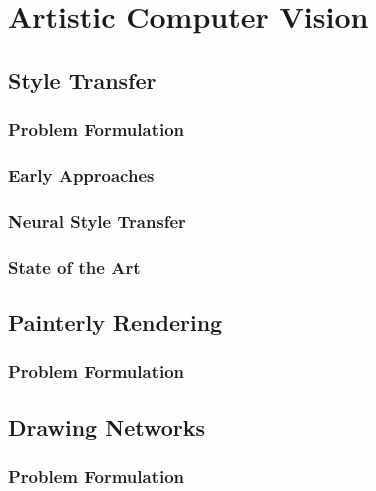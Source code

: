 \setchapterpreamble[u]{\margintoc}
\chapter{Artistic Computer Vision}

\section{Style Transfer}

\subsection{Problem Formulation}

\subsection{Early Approaches}

\subsection{Neural Style Transfer}

\subsection{State of the Art}

\section{Painterly Rendering}

\subsection{Problem Formulation}

\section{Drawing Networks}

\subsection{Problem Formulation}

